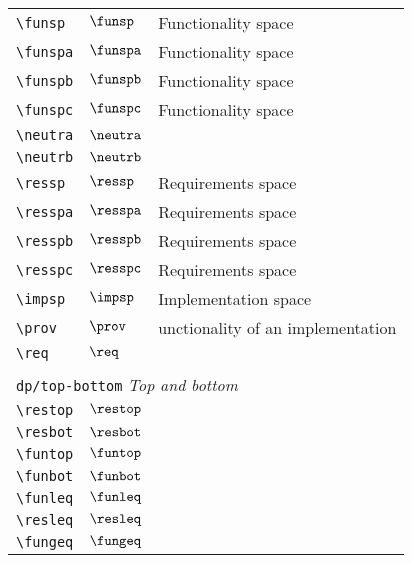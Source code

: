 \begin{longtable}{lll}
 {\color[rgb]{0.5,0.5,0.5}\texttt{\textbackslash funsp}} & $\funsp$ &  Functionality space\\ 
 {\color[rgb]{0.5,0.5,0.5}\texttt{\textbackslash funspa}} & $\funspa$ &  Functionality space\\ 
 {\color[rgb]{0.5,0.5,0.5}\texttt{\textbackslash funspb}} & $\funspb$ &  Functionality space\\ 
 {\color[rgb]{0.5,0.5,0.5}\texttt{\textbackslash funspc}} & $\funspc$ &  Functionality space\\ 
 {\color[rgb]{0.5,0.5,0.5}\texttt{\textbackslash neutra}} & $\neutra$ & \\ 
 {\color[rgb]{0.5,0.5,0.5}\texttt{\textbackslash neutrb}} & $\neutrb$ & \\ 
 {\color[rgb]{0.5,0.5,0.5}\texttt{\textbackslash ressp}} & $\ressp$ &  Requirements space\\ 
 {\color[rgb]{0.5,0.5,0.5}\texttt{\textbackslash resspa}} & $\resspa$ &  Requirements space\\ 
 {\color[rgb]{0.5,0.5,0.5}\texttt{\textbackslash resspb}} & $\resspb$ &  Requirements space\\ 
 {\color[rgb]{0.5,0.5,0.5}\texttt{\textbackslash resspc}} & $\resspc$ &  Requirements space\\ 
 {\color[rgb]{0.5,0.5,0.5}\texttt{\textbackslash impsp}} & $\impsp$ &  Implementation space\\ 
 {\color[rgb]{0.5,0.5,0.5}\texttt{\textbackslash prov}} & $\prov$ &  unctionality of an implementation\\ 
 {\color[rgb]{0.5,0.5,0.5}\texttt{\textbackslash req}} & $\req$ & \\ 
  &  & \\ 
 \multicolumn{3}{l}{{\color[rgb]{0.5,0.5,0.5}\texttt{dp/top-bottom}} \emph{Top and bottom}}\\ 
 \hline
{\color[rgb]{0.5,0.5,0.5}\texttt{\textbackslash restop}} & $\restop$ & \\ 
 {\color[rgb]{0.5,0.5,0.5}\texttt{\textbackslash resbot}} & $\resbot$ & \\ 
 {\color[rgb]{0.5,0.5,0.5}\texttt{\textbackslash funtop}} & $\funtop$ & \\ 
 {\color[rgb]{0.5,0.5,0.5}\texttt{\textbackslash funbot}} & $\funbot$ & \\ 
 {\color[rgb]{0.5,0.5,0.5}\texttt{\textbackslash funleq}} & $\funleq$ & \\ 
 {\color[rgb]{0.5,0.5,0.5}\texttt{\textbackslash resleq}} & $\resleq$ & \\ 
 {\color[rgb]{0.5,0.5,0.5}\texttt{\textbackslash fungeq}} & $\fungeq$ & \\ 

\end{longtable}
